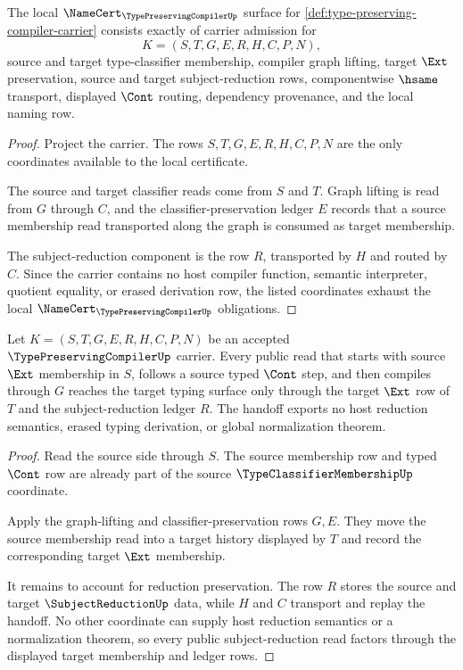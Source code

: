 \begin{theorem}
\label{thm:type-preserving-compiler-namecert-obligations}
The local $\NameCert_{\TypePreservingCompilerUp}$ surface for \autoref{def:type-preserving-compiler-carrier} consists exactly of carrier admission for
$$
K=(S,T,G,E,R,H,C,P,N),
$$
source and target type-classifier membership, compiler graph lifting, target $\Ext$ preservation, source and target subject-reduction rows, componentwise $\hsame$ transport, displayed $\Cont$ routing, dependency provenance, and the local naming row.
\end{theorem}
\begin{proof}
Project the carrier. The rows $S,T,G,E,R,H,C,P,N$ are the only coordinates available to the local certificate.

The source and target classifier reads come from $S$ and $T$. Graph lifting is read from $G$ through $C$, and the classifier-preservation ledger $E$ records that a source membership read transported along the graph is consumed as target membership.

The subject-reduction component is the row $R$, transported by $H$ and routed by $C$. Since the carrier contains no host compiler function, semantic interpreter, quotient equality, or erased derivation row, the listed coordinates exhaust the local $\NameCert_{\TypePreservingCompilerUp}$ obligations.
\end{proof}

\begin{theorem}
\label{thm:type-preserving-compiler-subject-reduction-handoff}
Let $K=(S,T,G,E,R,H,C,P,N)$ be an accepted $\TypePreservingCompilerUp$ carrier. Every public read that starts with source $\Ext$ membership in $S$, follows a source typed $\Cont$ step, and then compiles through $G$ reaches the target typing surface only through the target $\Ext$ row of $T$ and the subject-reduction ledger $R$. The handoff exports no host reduction semantics, erased typing derivation, or global normalization theorem.
\end{theorem}
\begin{proof}
Read the source side through $S$. The source membership row and typed $\Cont$ row are already part of the source $\TypeClassifierMembershipUp$ coordinate.

Apply the graph-lifting and classifier-preservation rows $G,E$. They move the source membership read into a target history displayed by $T$ and record the corresponding target $\Ext$ membership.

It remains to account for reduction preservation. The row $R$ stores the source and target $\SubjectReductionUp$ data, while $H$ and $C$ transport and replay the handoff. No other coordinate can supply host reduction semantics or a normalization theorem, so every public subject-reduction read factors through the displayed target membership and ledger rows.
\end{proof}

